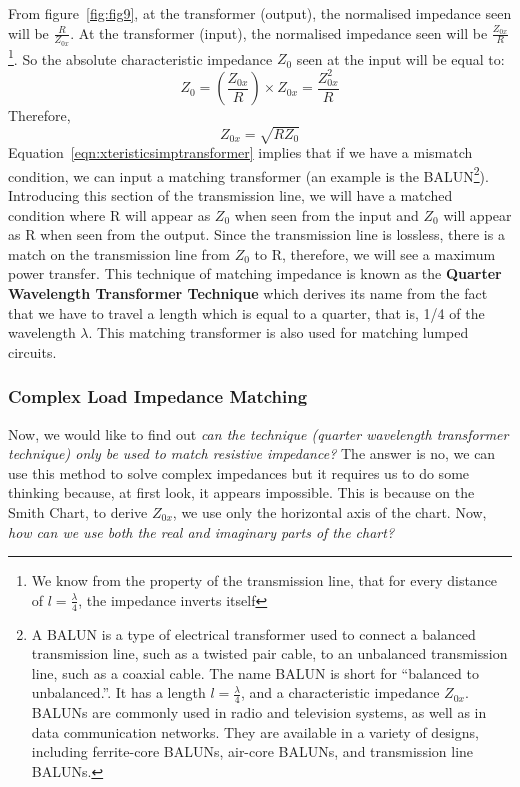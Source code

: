From figure~\ref{fig:fig9}, at the transformer (output), the normalised impedance seen will be $\frac{R}{Z_{0x}}$. At the transformer (input), the normalised impedance seen will be $\frac{Z_{0x}}{R}$\footnote{
We know from the property of the transmission line, that for every distance of $l = \frac{\lambda}{4}$, the impedance inverts itself
}. So the absolute characteristic impedance $ Z_0$ seen at the input will be equal to: 
\begin{dmath*}
Z_0=\left(\frac{Z_{0x}}{R}\right)\times Z_{0x}
=\frac{Z_{0x}^2}{R}
\end{dmath*}
Therefore,
\begin{equation}
Z_{0x}=\sqrt{RZ_0}
\label{eqn:xteristicsimptransformer}
\end{equation}
Equation~\eqref{eqn:xteristicsimptransformer} implies that if we have a mismatch condition, we can input a matching transformer (an example is the \uppercase{balun}\footnote{
A \uppercase{balun} is a type of electrical transformer used to connect a balanced transmission line, such as a twisted pair cable, to an unbalanced transmission line, such as a coaxial cable. The name \uppercase{balun} is short for \textquotedblleft\;balanced to unbalanced.\textquotedblright. It has a length $l=\frac{\lambda}{4}$, and a characteristic impedance $Z_{0x}$. \uppercase{Balun}s are commonly used in radio and television systems, as well as in data communication networks. They are available in a variety of designs, including ferrite-core \uppercase{balun}s, air-core \uppercase{balun}s, and transmission line \uppercase{balun}s.
}). Introducing this section of the transmission line, we will have a matched condition where R will appear as $ Z_0$ when seen from the input and $ Z_0$ will appear as R when seen from the output. Since the transmission line is lossless, there is a match on the transmission line from $ Z_0$ to R, therefore, we will see a maximum power transfer.
This technique of matching impedance is known as the \textbf{Quarter Wavelength Transformer Technique} which derives its name from the fact that we have to travel a length which is equal to a quarter, that is, 1/4 of the wavelength $\lambda$. This matching transformer is also used for matching lumped circuits.

\subsubsection{Complex Load Impedance Matching}
Now, we would like to find out \emph{can the technique (quarter wavelength transformer technique) only be used to match resistive impedance?} The answer is no, we can use this method to solve complex impedances but it requires us to do some thinking because, at first look, it appears impossible. This is because on the Smith Chart, to derive $Z_{0x}$, we use only the horizontal axis of the chart. Now, \emph{how can we use both the real and imaginary parts of the chart?}

